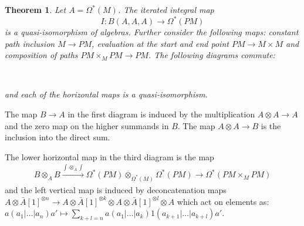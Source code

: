 \documentclass{scrartcl}
\theoremstyle{plain}
\newtheorem{theorem}{Theorem}[section]
\theoremstyle{definition}
\let\xto\xrightarrow
\begin{document}
\begin{theorem}\label{thm:path_models_1}
    Let $A=\Omega^*(M)$. The iterated integral map $$I\colon B(A, A, A)\to \Omega^*(PM)$$ is a quasi-isomorphism of algebras. Further consider the following maps: constant path inclusion $M\to PM$, evaluation at the start and end point $PM\to M\times M$ and composition of paths $PM\times_M PM\to PM$. The following diagrams commute:

    \begin{center}
    \qquad\qquad\qquad
    \\
    \qquad
    \end{center}
    and each of the horizontal maps is a quasi-isomorphism.
\end{theorem}

The map $B\to A$ in the first diagram is induced by the multiplication $A\otimes A\to A$ and the zero map on the higher summands in $B$. The map $A\otimes A\to B$ is the inclusion into the direct sum.

The lower horizontal map in the third diagram is the map 
\begin{align*}
    B\otimes_A B\xto{\int\otimes_A\int} \Omega^*(PM)\otimes_{\Omega^*(M)}\Omega^*(PM) \to \Omega^*(PM\times_M PM)
\end{align*}
and the left vertical map is induced by deconcatenation maps $A\otimes \bar A[1]^{\otimes n} \to A\otimes \bar A[1]^{\otimes k} \otimes A \otimes \bar A[1]^{\otimes l} \otimes A$ which act on elements as: $a(a_1|\dots|a_n)a'\mapsto \sum_{k+l=n} a(a_1|\dots|a_k) 1 (a_{k+1}|\dots|a_{k+l}) a'$.
\end{document}

